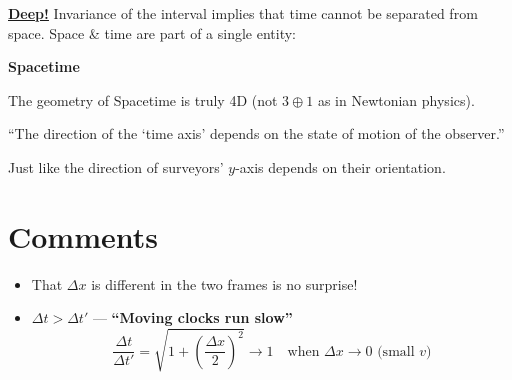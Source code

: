 \textbf{\underline{Deep!}} Invariance of the interval implies that time cannot be
separated from space. Space \& time are part of a single entity:

\begin{center}
  {\Large \textbf{Spacetime}}
\end{center}

The geometry of Spacetime is truly 4D (not $3\oplus 1$ as in Newtonian physics).

``The direction of the `time axis' depends on the state of motion of the observer.''

Just like the direction of surveyors' $y$-axis depends on their orientation.

\section*{Comments}

\begin{itemize}
  \item That $\Delta x$ is different in the two frames is no surprise!
  \item $\Delta t > \Delta t'$ \;--- \textbf{``Moving clocks run slow''}
\[
  \frac{\Delta t}{\Delta t'} = \sqrt{1+\!\left(\frac{\Delta x}{2}\right)^{\!2}} \to 1
  \quad\text{when } \Delta x\to 0 \text{ (small } v\text{)}
\]
\end{itemize}

\begin{center}
\end{center}

